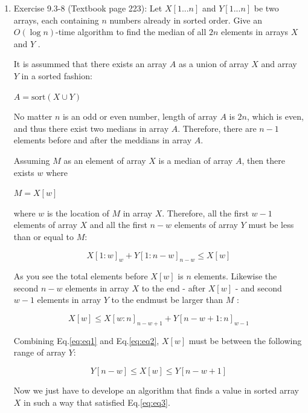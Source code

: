 \documentclass[11pt]{article}
\begin{document}
\begin{enumerate}

\itemsep 0.35in

\item Exercise 9.3-8 (Textbook page 223): Let $X[1...n]$ and $Y[1...n]$ be two arrays, each containing $n$ numbers already in sorted order. Give an $O(\log{n})$-time algorithm to find the median of all $2n$ elements in arrays $X$ and $Y$ .

	It is assummed that there exists an array $A$ as a union of array $X$ and array $Y$ in a sorted fashion:
	
	\hspace{10mm} $A=\mathrm {sort}(X \cup Y)$ 
	
	No matter $n$ is an odd or even number, length of array $A$ is $2n$, which is even, and thus there exist two medians in array $A$. Therefore, there are $n-1$ elements before and after the meddians in array $A$.
	
	Assuming $M$ as an element of array $X$ is a median of array $A$, then there exists $w$ where
	
	\hspace{10mm} $M=X[w]$ 
	
	where $w$ is the location of $M$ in array $X$. Therefore, all the first $w-1$ elements of array $X$ and all the first $n-w$ elements of array $Y$ must be less than or equal to $M$:
	
    \begin{equation} 
		X[1:w]_{w} + Y[1:n-w]_{n-w}  \leq X[w]
        \label{eq:eq1}
    \end{equation}
     
    As you see the total elements before $X[w]$ is $n$ elements. Likewise the second $n-w$ elements in array $X$ to the end - after $X[w]$ - and second $w-1$ elements in array $Y$ to the endmust be larger than $M$ :
	
    \begin{equation} 
    	X[w] \leq X[w:n]_{n-w+1} + Y[n-w+1:n]_{w-1}
        \label{eq:eq2}
     \end{equation}
     
    Combining Eq.\eqref{eq:eq1} and Eq.\eqref{eq:eq2}, $X[w]$ must be between the following range of array $Y$:
     
    \begin{equation} 
		Y[n-w]  \leq X[w] \leq Y[n-w+1]
        \label{eq:eq3}
     \end{equation}
     
     Now we just have to develope an algorithm that finds a value in sorted array $X$ in such a way that satisfied Eq.\eqref{eq:eq3}.
     

\end{enumerate}
\end{document}
